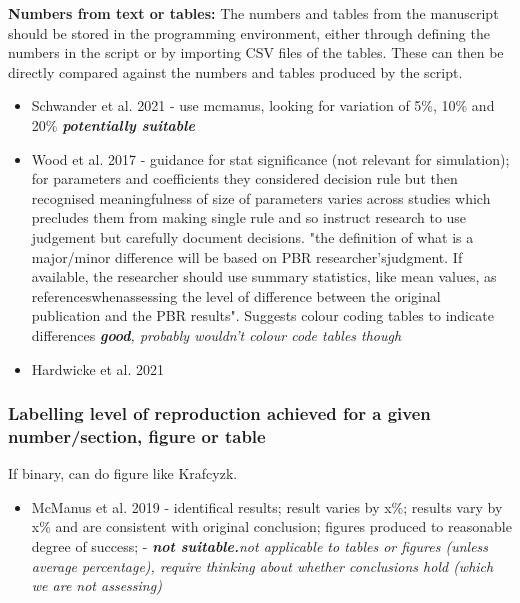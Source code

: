 \textbf{Numbers from text or tables:} The numbers and tables from the manuscript should be stored in the programming environment, either through defining the numbers in the script or by importing CSV files of the tables. These can then be directly compared against the numbers and tables produced by the script.

\begin{itemize}
    \item Schwander et al. 2021 - use mcmanus, looking for variation of 5\%, 10\% and 20\%\autocite{schwander_replication_2021} \textit{\textbf{potentially suitable}}
    \item Wood et al. 2017 - guidance for stat significance (not relevant for simulation); for parameters and coefficients they considered decision rule but then recognised meaningfulness of size of parameters varies across studies which precludes them from making single rule and so instruct research to use judgement but carefully document decisions. "the definition of what is a major/minor difference will be based on PBR researcher’sjudgment. If available, the researcher should use summary statistics, like mean values, as referenceswhenassessing the level of difference between the original publication and the PBR results". Suggests colour coding tables to indicate differences\autocite{wood_push_2018, wood_replication_2018} \textit{\textbf{good}, probably wouldn't colour code tables though}
    \item Hardwicke et al. 2021 \autocite{hardwicke_analytic_2021, hardwicke_pre-registered_2017}
\end{itemize}

\subsubsection{Labelling level of reproduction achieved for a given number/section, figure or table}

If binary, can do figure like Krafcyzk.

\begin{itemize}
    \item McManus et al. 2019 - identifical results; result varies by x\%; results vary by x\% and are consistent with original conclusion; figures produced to reasonable degree of success;\autocite{mcmanus_can_2019} - \textit{\textbf{not suitable.}not applicable to tables or figures (unless average percentage), require thinking about whether conclusions hold (which we are not assessing)}
\end{itemize}

